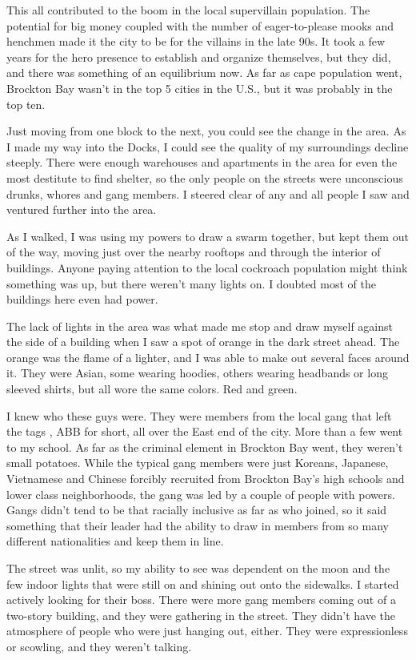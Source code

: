 This all contributed to the boom in the local supervillain population. The potential for big money coupled with the number of eager-to-please mooks and henchmen made it the city to be for the villains in the late 90s. It took a few years for the hero presence to establish and organize themselves, but they did, and there was something of an equilibrium now. As far as cape population went, Brockton Bay wasn't in the top 5 cities in the U.S., but it was probably in the top ten.

Just moving from one block to the next, you could see the change in the area. As I made my way into the Docks, I could see the quality of my surroundings decline steeply. There were enough warehouses and apartments in the area for even the most destitute to find shelter, so the only people on the streets were unconscious drunks, whores and gang members. I steered clear of any and all people I saw and ventured further into the area.

As I walked, I was using my powers to draw a swarm together, but kept them out of the way, moving just over the nearby rooftops and through the interior of buildings. Anyone paying attention to the local cockroach population might think something was up, but there weren't many lights on. I doubted most of the buildings here even had power.

The lack of lights in the area was what made me stop and draw myself against the side of a building when I saw a spot of orange in the dark street ahead. The orange was the flame of a lighter, and I was able to make out several faces around it. They were Asian, some wearing hoodies, others wearing headbands or long sleeved shirts, but all wore the same colors. Red and green.

I knew who these guys were. They were members from the local gang that left the tags , ABB for short, all over the East end of the city. More than a few went to my school. As far as the criminal element in Brockton Bay went, they weren't small potatoes. While the typical gang members were just Koreans, Japanese, Vietnamese and Chinese forcibly recruited from Brockton Bay's high schools and lower class neighborhoods, the gang was led by a couple of people with powers. Gangs didn't tend to be that racially inclusive as far as who joined, so it said something that their leader had the ability to draw in members from so many different nationalities and keep them in line.

The street was unlit, so my ability to see was dependent on the moon and the few indoor lights that were still on and shining out onto the sidewalks. I started actively looking for their boss. There were more gang members coming out of a two-story building, and they were gathering in the street. They didn't have the atmosphere of people who were just hanging out, either. They were expressionless or scowling, and they weren't talking.

